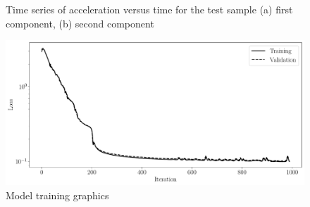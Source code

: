 \documentclass[sn-mathphys-num]{sn-jnl}
\theoremstyle{thmstylethree}
\theoremstyle{thmstyletwo}
\theoremstyle{thmstyleone}
\begin{document}
\begin{figure}[!htbp]
 \caption{Time series of acceleration versus time for the test sample (a) first component, (b) second component}
 \label{fig: trajectory}
\end{figure}

\begin{figure}[!htbp]
\centering\includegraphics[scale = 0.42]{experiment4_1000.pickle_loss.pdf}
\caption{Model training graphics}
\label{fig: learning_rate}
\end{figure}
\end{document}
